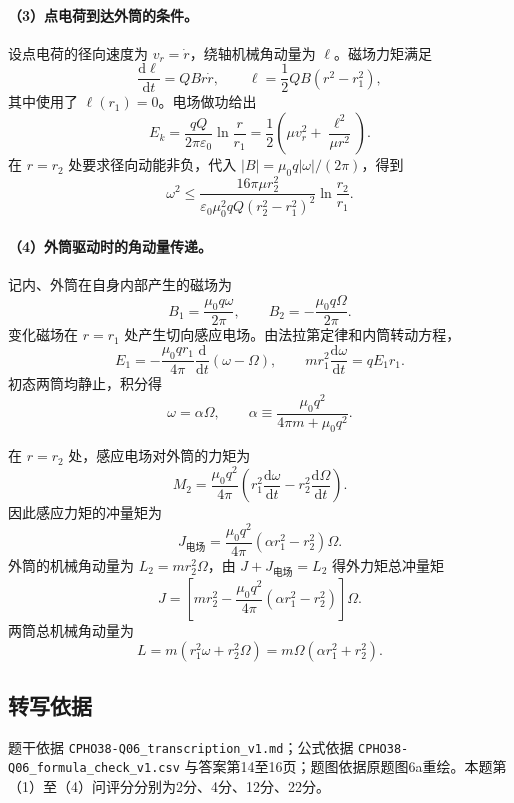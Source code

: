\paragraph{（3）点电荷到达外筒的条件。}
设点电荷的径向速度为 $v_r=\dot r$，绕轴机械角动量为 $\ell$。磁场力矩满足
\[
\frac{\mathrm d\ell}{\mathrm dt}=QB r\dot r,
\qquad
\ell=\frac12QB(r^2-r_1^2),
\]
其中使用了 $\ell(r_1)=0$。电场做功给出
\[
E_k=\frac{qQ}{2\pi\varepsilon_0}\ln\frac r{r_1}
=\frac12\left(\mu v_r^2+\frac{\ell^2}{\mu r^2}\right).
\]
在 $r=r_2$ 处要求径向动能非负，代入 $|B|=\mu_0q|\omega|/(2\pi)$，得到
\[
\boxed{
\omega^2\le
\frac{16\pi\mu r_2^2}
{\varepsilon_0\mu_0^2qQ(r_2^2-r_1^2)^2}
\ln\frac{r_2}{r_1}.}
\]

\paragraph{（4）外筒驱动时的角动量传递。}
记内、外筒在自身内部产生的磁场为
\[
B_1=\frac{\mu_0q\omega}{2\pi},
\qquad
B_2=-\frac{\mu_0q\Omega}{2\pi}.
\]
变化磁场在 $r=r_1$ 处产生切向感应电场。由法拉第定律和内筒转动方程，
\[
E_1=-\frac{\mu_0qr_1}{4\pi}\frac{\mathrm d}{\mathrm dt}(\omega-\Omega),
\qquad
mr_1^2\frac{\mathrm d\omega}{\mathrm dt}=qE_1r_1.
\]
初态两筒均静止，积分得
\[
\boxed{\omega=\alpha\Omega,\qquad
\alpha\equiv\frac{\mu_0q^2}{4\pi m+\mu_0q^2}.}
\]

在 $r=r_2$ 处，感应电场对外筒的力矩为
\[
M_2=\frac{\mu_0q^2}{4\pi}
\left(r_1^2\frac{\mathrm d\omega}{\mathrm dt}
-r_2^2\frac{\mathrm d\Omega}{\mathrm dt}\right).
\]
因此感应力矩的冲量矩为
\[
J_{\text{电场}}=\frac{\mu_0q^2}{4\pi}(\alpha r_1^2-r_2^2)\Omega.
\]
外筒的机械角动量为 $L_2=mr_2^2\Omega$，由 $J+J_{\text{电场}}=L_2$ 得外力矩总冲量矩
\[
\boxed{J=\left[mr_2^2-\frac{\mu_0q^2}{4\pi}
(\alpha r_1^2-r_2^2)\right]\Omega.}
\]
两筒总机械角动量为
\[
\boxed{L=m(r_1^2\omega+r_2^2\Omega)
=m\Omega(\alpha r_1^2+r_2^2).}
\]

\subsection{转写依据}
题干依据 \texttt{CPHO38-Q06\_transcription\_v1.md}；公式依据 \texttt{CPHO38-Q06\_formula\_check\_v1.csv} 与答案第14至16页；题图依据原题图6a重绘。本题第（1）至（4）问评分分别为2分、4分、12分、22分。

